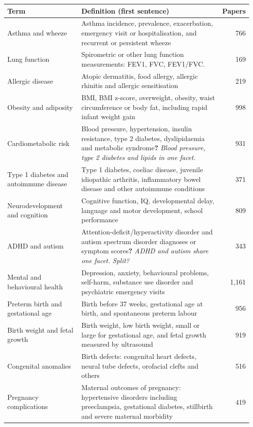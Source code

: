 \documentclass[10pt]{article}
\begin{document}
\begin{longtable}{@{}P{3.6cm}P{9.4cm}r@{}}\toprule Term & Definition (first sentence) & Papers\\\midrule\endhead
Asthma and wheeze & Asthma incidence, prevalence, exacerbation, emergency visit or hospitalisation, and recurrent or persistent wheeze & 766\\
Lung function & Spirometric or other lung function measurements: FEV1, FVC, FEV1/FVC. & 169\\
Allergic disease & Atopic dermatitis, food allergy, allergic rhinitis and allergic sensitisation & 219\\
Obesity and adiposity & BMI, BMI z-score, overweight, obesity, waist circumference or body fat, including rapid infant weight gain & 998\\
Cardiometabolic risk & Blood pressure, hypertension, insulin resistance, type 2 diabetes, dyslipidaemia and metabolic syndrome\newline\textbf{?} \emph{Blood pressure, type 2 diabetes and lipids in one facet.} & 931\\
Type 1 diabetes and autoimmune disease & Type 1 diabetes, coeliac disease, juvenile idiopathic arthritis, inflammatory bowel disease and other autoimmune conditions & 371\\
Neurodevelopment and cognition & Cognitive function, IQ, developmental delay, language and motor development, school performance & 809\\
ADHD and autism & Attention-deficit/hyperactivity disorder and autism spectrum disorder diagnoses or symptom scores\newline\textbf{?} \emph{ADHD and autism share one facet. Split?} & 343\\
Mental and behavioural health & Depression, anxiety, behavioural problems, self-harm, substance use disorder and psychiatric emergency visits & 1,161\\
Preterm birth and gestational age & Birth before 37 weeks, gestational age at birth, and spontaneous preterm labour & 956\\
Birth weight and fetal growth & Birth weight, low birth weight, small or large for gestational age, and fetal growth measured by ultrasound & 919\\
Congenital anomalies & Birth defects: congenital heart defects, neural tube defects, orofacial clefts and others & 516\\
Pregnancy complications & Maternal outcomes of pregnancy: hypertensive disorders including preeclampsia, gestational diabetes, stillbirth and severe maternal morbidity & 419\\

\end{longtable}
\end{document}
